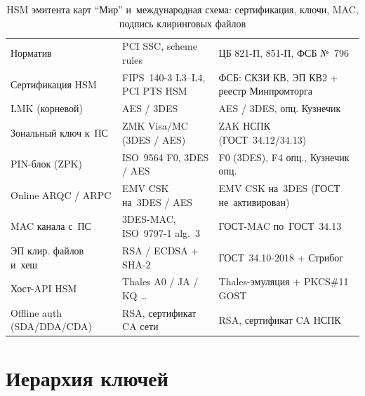 \begin{table}[!ht]
  \caption{HSM эмитента карт \enquote{Мир} и~международная схема: сертификация,
  ключи, MAC, подпись клиринговых файлов}\label{tab:crypto-hsm-mir}
  \begingroup
  \tablesetup
  \begin{minipage}{\textwidth}
    \begin{tabularx}{\textwidth}{@{}B{0.24\textwidth} Y Y@{}}
      \toprule
      \headrow
       &  &
       \\
      \midrule
      Норматив & PCI SSC, scheme rules & ЦБ 821-П, 851-П, ФСБ №~796 \\
      \rowsep
      Сертификация HSM & FIPS~140-3 L3--L4, PCI PTS HSM &
      ФСБ: СКЗИ КВ, ЭП КВ2 + реестр Минпромторга \\
      \rowsep
      LMK (корневой) & AES / 3DES & AES / 3DES, опц. Кузнечик \\
      \rowsep
      Зональный ключ к~ПС & ZMK Visa/MC (3DES / AES) &
      ZAK НСПК (ГОСТ~34.12/34.13) \\
      \rowsep
      PIN-блок (ZPK) & ISO~9564 F0, 3DES / AES &
      F0 (3DES), F4 опц., Кузнечик опц. \\
      \rowsep
      Online ARQC / ARPC & EMV CSK на~3DES / AES &
      EMV CSK на~3DES (ГОСТ не~активирован) \\
      \rowsep
      MAC канала с~ПС & 3DES-MAC, ISO~9797-1 alg.~3 & ГОСТ-MAC по~ГОСТ~34.13 \\
      \rowsep
      ЭП клир. файлов и~хеш & RSA / ECDSA + SHA-2 & ГОСТ~34.10-2018 + Стрибог \\
      \rowsep
      Хост-API HSM & Thales A0 / JA / KQ \ldots &
      Thales-эмуляция + PKCS\#11 GOST \\
      \rowsep
      Offline auth (SDA/DDA/CDA) & RSA, сертификат CA сети &
      RSA, сертификат CA НСПК \\
      \bottomrule
    \end{tabularx}
    \par\smallskip
  \end{minipage}\par
  \endgroup
\end{table}

\FloatBarrier
\section{Иерархия ключей}\label{sec:crypto-key-hierarchy}

